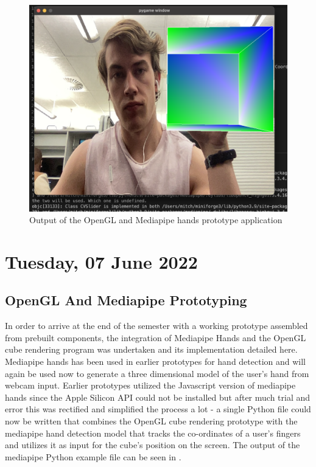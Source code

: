 \begin{figure}[h]
    \centering
    \includegraphics[width=0.6\linewidth]{figures/OpenGL Mediapipe Cube.png}
    \caption{Output of the OpenGL and Mediapipe hands prototype application}
    \label{fig:OpenGL Mediapipe Cube}
\end{figure}

\section[2022/06/07]{Tuesday, 07 June 2022}

\subsection{OpenGL And Mediapipe Prototyping}

In order to arrive at the end of the semester with a working prototype assembled from prebuilt components, the integration of Mediapipe Hands and the OpenGL cube rendering program was undertaken and its implementation detailed here. \\

Mediapipe hands has been used in earlier prototypes for hand detection and will again be used now to generate a three dimensional model of the user's hand from webcam input. Earlier prototypes utilized the Javascript version of mediapipe hands since the Apple Silicon API could not be installed but after much trial and error this was rectified and simplified the process a lot - a single Python file could now be written that combines the OpenGL cube rendering prototype with the mediapipe hand detection model that tracks the co-ordinates of a user's fingers and utilizes it as input for the cube's position on the screen. The output of the mediapipe Python example file can be seen in .\\

